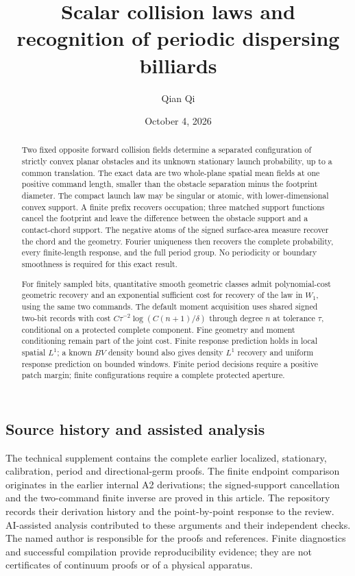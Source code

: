 \documentclass[11pt]{amsart}
\title[Scalar collision laws]{Scalar collision laws and recognition of periodic dispersing billiards}
\author{Qian Qi}
\date{October 4, 2026}
\begin{document}
\raggedbottom
\begin{abstract}
Two fixed opposite forward collision fields determine a separated
configuration of strictly convex planar obstacles and its unknown
stationary launch probability, up to a common translation. The exact
data are two whole-plane spatial mean fields at one positive command
length, smaller than the obstacle separation minus the footprint
diameter. The compact launch law may be singular or atomic, with
lower-dimensional convex support. A finite prefix recovers occupation;
three matched support functions cancel the footprint and leave the
difference between the obstacle support and a contact-chord support.
The negative atoms of the signed surface-area measure recover the
chord and the geometry. Fourier uniqueness then recovers the complete
probability, every finite-length response, and the full period group.
No periodicity or boundary smoothness is required for this exact result.

For finitely sampled bits, quantitative smooth geometric classes admit
polynomial-cost geometric recovery and an exponential sufficient cost
for recovery of the law in $W_1$, using the same two commands. The
default moment acquisition uses shared signed two-bit records with
cost $C\tau^{-2}\log(C(n+1)/\delta)$ through degree $n$ at tolerance
$\tau$, conditional on a protected complete component. Fine geometry
and moment conditioning remain part of the joint cost. Finite response
prediction holds in local spatial $L^1$; a known $BV$ density bound
also gives density $L^1$ recovery and uniform response prediction on
bounded windows. Finite period decisions require a positive patch
margin; finite configurations require a complete protected aperture.
\end{abstract}
\maketitle
\enlargethispage{2pt}






\appendix


\subsection*{Source history and assisted analysis}
The technical supplement contains the complete earlier localized,
stationary, calibration, period and directional-germ proofs. The
finite endpoint comparison originates in the earlier internal A2
derivations; the signed-support cancellation and the two-command
finite inverse are proved in this article. The repository records
their derivation history and the point-by-point response to the review.
AI-assisted analysis contributed to these arguments and their
independent checks. The named author is responsible for the proofs
and references. Finite diagnostics and successful compilation provide
reproducibility evidence; they are not certificates of continuum
proofs or of a physical apparatus.

\end{document}
